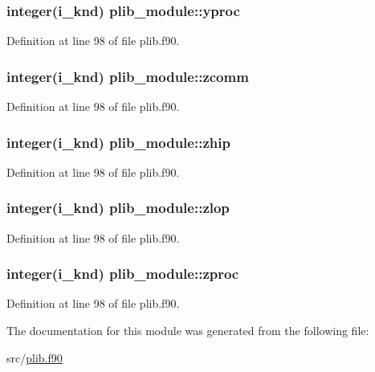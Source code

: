 \hypertarget{classplib__module_a75e3d1fe13879374c5966909045b4670}{
\subsubsection[{yproc}]{\setlength{\rightskip}{0pt plus 5cm}integer(i\-\_\-knd) plib\-\_\-module\-::yproc}}\label{classplib__module_a75e3d1fe13879374c5966909045b4670}


Definition at line 98 of file plib.\-f90.

\hypertarget{classplib__module_aecf72186ecae9823c0bbe21808acb840}{
\subsubsection[{zcomm}]{\setlength{\rightskip}{0pt plus 5cm}integer(i\-\_\-knd) plib\-\_\-module\-::zcomm}}\label{classplib__module_aecf72186ecae9823c0bbe21808acb840}


Definition at line 98 of file plib.\-f90.

\hypertarget{classplib__module_ac18f767501ee98501fbf13da3185aae7}{
\subsubsection[{zhip}]{\setlength{\rightskip}{0pt plus 5cm}integer(i\-\_\-knd) plib\-\_\-module\-::zhip}}\label{classplib__module_ac18f767501ee98501fbf13da3185aae7}


Definition at line 98 of file plib.\-f90.

\hypertarget{classplib__module_a3a7c2d7b52bbd28281bd1affd1d50bf1}{
\subsubsection[{zlop}]{\setlength{\rightskip}{0pt plus 5cm}integer(i\-\_\-knd) plib\-\_\-module\-::zlop}}\label{classplib__module_a3a7c2d7b52bbd28281bd1affd1d50bf1}


Definition at line 98 of file plib.\-f90.

\hypertarget{classplib__module_abce2abcf8d84587f2d4a066fa1287d81}{
\subsubsection[{zproc}]{\setlength{\rightskip}{0pt plus 5cm}integer(i\-\_\-knd) plib\-\_\-module\-::zproc}}\label{classplib__module_abce2abcf8d84587f2d4a066fa1287d81}


Definition at line 98 of file plib.\-f90.



The documentation for this module was generated from the following file\-:\begin{DoxyCompactItemize}
\item 
src/\hyperlink{plib_8f90}{plib.\-f90}\end{DoxyCompactItemize}

